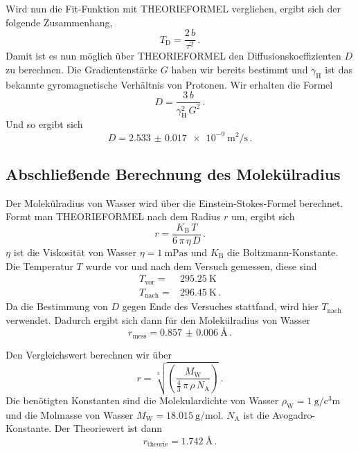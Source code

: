Wird nun die Fit-Funktion mit THEORIEFORMEL verglichen, ergibt sich der folgende Zusammenhang,
\begin{equation}
    T_\text{D} = \frac{2 \, b}{\tau ^2} \, . 
    \label{eq:b_td}
\end{equation}
Damit ist es nun möglich über THEORIEFORMEL den Diffusionskoeffizienten $D$ zu berechnen.
Die Gradientenstärke $G$ haben wir bereits bestimmt und $\gamma _\text{H}$ ist das bekannte gyromagnetische Verhältnis von Protonen.
Wir erhalten die Formel 
\begin{equation}
    D = \frac{3 \, b}{\gamma _\text{H}^2 \, G^2 } \, . 
    \label{eq:diffusion}
\end{equation}
Und so ergibt sich 
\begin{equation*}
    D = \SI{2.533(17)e-9}{\meter\squared\per\second} \, . 
    \label{eq:diffusion_wert}
\end{equation*}

\subsection{Abschließende Berechnung des Molekülradius}
\label{ssec:aus4}

Der Molekülradius von Wasser wird über die Einstein-Stokes-Formel berechnet.
Formt man THEORIEFORMEL nach dem Radius $r$ um, ergibt sich 
\begin{equation}
    r =  \frac{K_\text{B} \, T}{6 \, \pi \, \eta \, D } \, .
    \label{eq:stokes}
\end{equation}
$\eta$ ist die Viskosität von Wasser $\eta = \SI{1}{\milli\pascal\second} $ und $K_\text{B}$ die Boltzmann-Konstante. \cite{wasser}
Die Temperatur $T$ wurde vor und nach dem Versuch gemessen, diese sind 
\begin{align*}
    T_\text{vor} =& \SI{295.25}{\kelvin} \\
    T_\text{nach} =& \SI{296.45}{\kelvin} \, .
\end{align*}
Da die Bestimmung von $D$ gegen Ende des Versuches stattfand, wird hier $T_\text{nach}$ verwendet.
Dadurch ergibt sich dann für den Molekülradius von Wasser
\begin{equation*}
    r_\text{mess} = \SI{0.857(6)}{\angstrom}  \, .
    \label{eq:radius1}
\end{equation*}

Den Vergleichswert berechnen wir über
\begin{equation}
    r =  \sqrt[3]{ \left(  \frac{M_\text{W}}{\frac{4}{3} \, \pi \, \rho \, N_\text{A} }  \right)} \, .
    \label{eq:hexagonal}
\end{equation}
Die benötigten Konstanten sind die Molekulardichte von Wasser $\rho _\text{W} = \SI{1}{\gram\per\cubic\centi\meter}$ und die Molmasse von Wasser
$M _\text{W} = \SI{18.015}{\gram\per\mol}$. \cite{wasser}
$N_\text{A}$ ist die Avogadro-Konstante.
Der Theoriewert ist dann 
\begin{equation*}
    r_\text{theorie} = \SI{1.742}{\angstrom}  \, .
    \label{eq:radius2}
\end{equation*}
